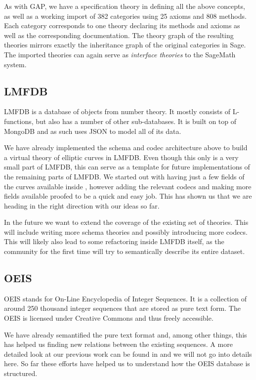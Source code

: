 As with GAP, we have a specification theory in \MMT defining all the above concepts, as well as a working import of 382 categories using 25 axioms and 808 methods. Each category corresponds to one \MMT theory declaring its methods and axioms as well as the corresponding documentation. The theory graph of the resulting theories mirrors exactly the inheritance graph of the original categories in Sage. The imported theories can again serve as \emph{interface theories} to the SageMath system.

\subsection{LMFDB}\label{sec:lmfdb}

LMFDB \cite{lmfdb} is a database of objects from number theory. It mostly consists of
L-functions, but also has a number of other sub-databases. It is built on top of MongoDB
and as such uses JSON to model all of its data.

We have already implemented the schema and codec architecture above to build a virtual
theory of elliptic curves in LMFDB. Even though this only is a very small part of LMFDB,
this can serve as a template for future implementations of the remaining parts of
LMFDB. We started out with having just a few fields of the curves available inside \MMT,
however adding the relevant codecs and making more fields available proofed to be a quick
and easy job. This has shown us that we are heading in the right direction with our ideas
so far.

In the future we want to extend the coverage of the existing set of theories. This will
include writing more schema theories and possibly introducing more codecs. This will
likely also lead to some refactoring inside LMFDB itself, as the community for the first
time will try to semantically describe its entire dataset.

\subsection{OEIS}

OEIS \cite{oeis} stands for On-Line Encyclopedia of Integer Sequences. It is a collection
of around 250 thousand integer sequences that are stored as pure text form. The OEIS is
licensed under Creative Commons and thus freely accessible.

We have already semantified the pure text format and, among other things, this has helped
us finding new relations between the existing sequences. A more detailed look at our
previous work can be found in \cite{LuzKoh:fsarfo16} and we will not go into details
here. So far these efforts have helped us to understand how the OEIS database is
structured.

